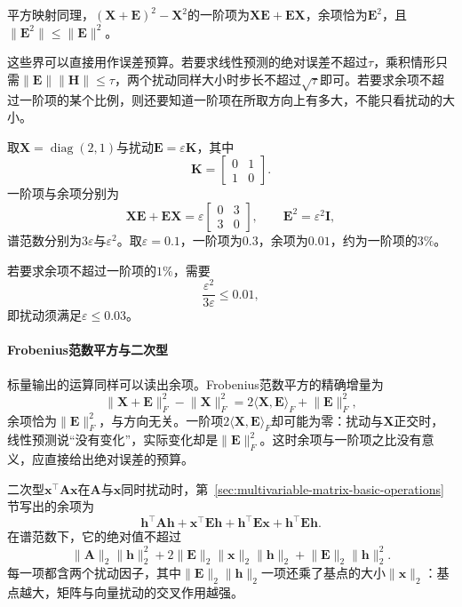 平方映射同理，$(\bm X+\bm E)^2-\bm X^2$的一阶项为$\bm X\bm E+\bm E\bm X$，余项恰为$\bm E^2$，且$\lVert\bm E^2\rVert\leq\lVert\bm E\rVert^2$。

这些界可以直接用作误差预算。若要求线性预测的绝对误差不超过$\tau$，乘积情形只需$\lVert\bm E\rVert\lVert\bm H\rVert\leq\tau$，两个扰动同样大小时步长不超过$\sqrt\tau$即可。若要求余项不超过一阶项的某个比例，则还要知道一阶项在所取方向上有多大，不能只看扰动的大小。
\begin{example}[矩阵平方的一阶预测]
\label{ex:multivariable-square-first-order-check}
取$\bm X=\operatorname{diag}(2,1)$与扰动$\bm E=\varepsilon\bm K$，其中
\[
 \bm K=\begin{bmatrix}0&1\\1&0\end{bmatrix}.
\]
一阶项与余项分别为
\[
 \bm X\bm E+\bm E\bm X=\varepsilon\begin{bmatrix}0&3\\3&0\end{bmatrix},\qquad
 \bm E^2=\varepsilon^2\bm I ,
\]
谱范数分别为$3\varepsilon$与$\varepsilon^2$。取$\varepsilon=0.1$，一阶项为$0.3$，余项为$0.01$，约为一阶项的$3\%$。

若要求余项不超过一阶项的$1\%$，需要
\[
 \frac{\varepsilon^2}{3\varepsilon}\leq0.01 ,
\]
即扰动须满足$\varepsilon\leq0.03$。
\end{example}

\paragraph{Frobenius范数平方与二次型}
标量输出的运算同样可以读出余项。Frobenius范数平方的精确增量为
\[
 \lVert\bm X+\bm E\rVert_F^2-\lVert\bm X\rVert_F^2=2\langle\bm X,\bm E\rangle_F+\lVert\bm E\rVert_F^2 ,
\]
余项恰为$\lVert\bm E\rVert_F^2$，与方向无关。一阶项$2\langle\bm X,\bm E\rangle_F$却可能为零：扰动与$\bm X$正交时，线性预测说“没有变化”，实际变化却是$\lVert\bm E\rVert_F^2$。这时余项与一阶项之比没有意义，应直接给出绝对误差的预算。

二次型$\bm x^\top\bm A\bm x$在$\bm A$与$\bm x$同时扰动时，第~\ref{sec:multivariable-matrix-basic-operations}节写出的余项为
\[
 \bm h^\top\bm A\bm h+\bm x^\top\bm E\bm h+\bm h^\top\bm E\bm x+\bm h^\top\bm E\bm h .
\]
在谱范数下，它的绝对值不超过
\[
 \lVert\bm A\rVert_2\lVert\bm h\rVert_2^2+2\lVert\bm E\rVert_2\lVert\bm x\rVert_2\lVert\bm h\rVert_2+\lVert\bm E\rVert_2\lVert\bm h\rVert_2^2 .
\]
每一项都含两个扰动因子，其中$\lVert\bm E\rVert_2\lVert\bm h\rVert_2$一项还乘了基点的大小$\lVert\bm x\rVert_2$：基点越大，矩阵与向量扰动的交叉作用越强。

